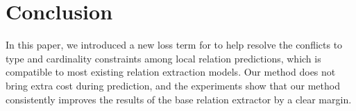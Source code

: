 \section{Conclusion}
In this paper, we introduced a new loss term for \RE to help resolve the conflicts to type and cardinality constraints among local relation predictions, which is compatible to most existing relation extraction models.
Our method does not bring extra cost during prediction, and the experiments show that our method consistently improves the results of the base relation extractor by a clear margin. 
